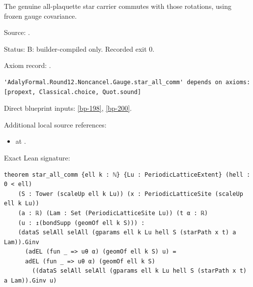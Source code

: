 \begin{theorem}[bp-201]
\label{bp-201}
\leanok
The genuine all-plaquette star carrier commutes with those rotations, using frozen gauge covariance.

\par Source: \texttt{}.
\par Status: B: builder-compiled only. Recorded exit 0.
\par Axiom record: \texttt{}.
\begin{verbatim}
'AdalyFormal.Round12.Noncancel.Gauge.star_all_comm' depends on axioms: [propext, Classical.choice, Quot.sound]
\end{verbatim}
\par Direct blueprint inputs: \ref{bp-198}, \ref{bp-200}.
\par Additional local source references:
\begin{itemize}
\item \texttt{} at \texttt{}.
\end{itemize}
\par Exact Lean signature:
\begin{verbatim}
theorem star_all_comm {ell k : ℕ} {Lu : PeriodicLatticeExtent} (hell : 0 < ell)
    (S : Tower (scaleUp ell k Lu)) (x : PeriodicLatticeSite (scaleUp ell k Lu))
    (a : ℝ) (Lam : Set (PeriodicLatticeSite Lu)) (t α : ℝ)
    (u : ↥(bondSupp (geomOf ell k S))) :
    (dataS selAll selAll (gparams ell k Lu hell S (starPath x t) a Lam)).Ginv
      (adEL (fun _ => uθ α) (geomOf ell k S) u) =
      adEL (fun _ => uθ α) (geomOf ell k S)
        ((dataS selAll selAll (gparams ell k Lu hell S (starPath x t) a Lam)).Ginv u)
\end{verbatim}
\end{theorem}

